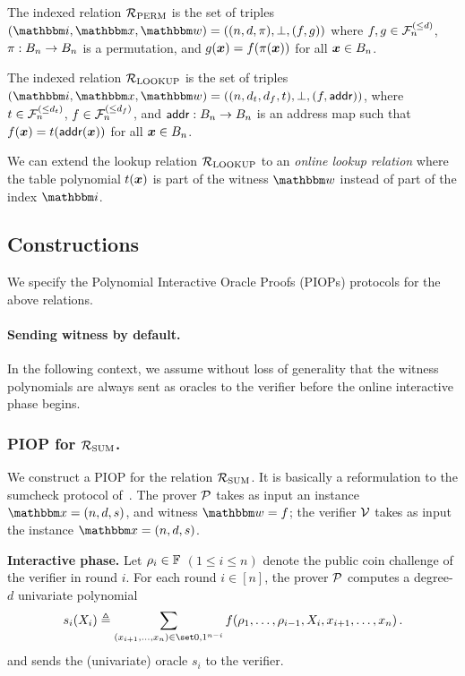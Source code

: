 \begin{definition}\label{def:rperm}
    The indexed relation ${\mathcal{R}}_{\text{PERM}}$ is the set of triples $(\idxR, \instR, \witR)=
    ((n, d, \perm), \bot, (f, g))$ where $f, g \in {\mathcal{F}}_{n}^{(\le{d})}$, $\pi : B_{n} \rightarrow B_{n}$
    is a permutation, and $g(\boldsymbol{x}) = f(\pi(\boldsymbol{x}))$ for all $\boldsymbol{x} \in B_{n}$.
\end{definition}

\begin{definition}\label{def:rlookup}
    The indexed relation ${\mathcal{R}}_{\text{LOOKUP}}$ is the set of triples $(\idxR, \instR, \witR)=
    ((n, d_t, d_f, t), \bot, (f, \addr))$, where $t \in {\mathcal{F}}_{n}^{(\le{d_t})}$, $f \in {\mathcal{F}}_{n}^{(\le{d_f})}$,
    and $\mathsf{addr}: B_{n} \rightarrow B_{n}$ is an address map such that 
    $f(\boldsymbol{x}) = t(\mathsf{addr}(\boldsymbol{x}))$ for all $\boldsymbol{x} \in B_{n}$.
\end{definition}

\begin{remark}
    We can extend the lookup relation ${\mathcal{R}}_{\text{LOOKUP}}$ to an \emph{online lookup relation}
    where the table polynomial $t(\boldsymbol{x})$ is part of the witness $\witR$ 
    instead of part of the index $\idxR$.
\end{remark}

\subsection{Constructions}
We specify the Polynomial Interactive Oracle Proofs (PIOPs) protocols for the above relations.

\paragraph*{Sending witness by default.}
In the following context, we assume without loss of generality that the witness polynomials 
are always sent as oracles to the verifier before the online interactive phase begins.

\subsubsection*{PIOP for ${\mathcal{R}}_{\text{SUM}}$.} We construct a PIOP for 
the relation ${\mathcal{R}}_{\text{SUM}}$. It is basically a reformulation to the sumcheck protocol
of~\cite{LFKN92}.
The prover $\mathcal{P}$ takes as input an instance $\instR = (n, d, s)$,
and witness $\witR = f$; the verifier $\mathcal{V}$ takes as input the 
instance $\instR = (n, d, s)$.

\textbf{Interactive phase.} 
Let $\rho_{i} \in \mathbb{F}$ $(1 \le i \le n)$ denote the public coin challenge
of the verifier in round $i$.
For each round $i \in [n]$, the prover $\mathcal{P}$ computes a 
degree-$d$ univariate polynomial
\[
      s_i(X_i) \deq 
      \sum_{ (x_{i+1}, \dots, x_{n}) \in \zo^{n-i} } 
      f(\chal{1}, \dots, \chal{i-1}, X_i, x_{i+1}, \dots, x_n) \,.
\]
and sends the (univariate) oracle $s_i$ to the verifier.

